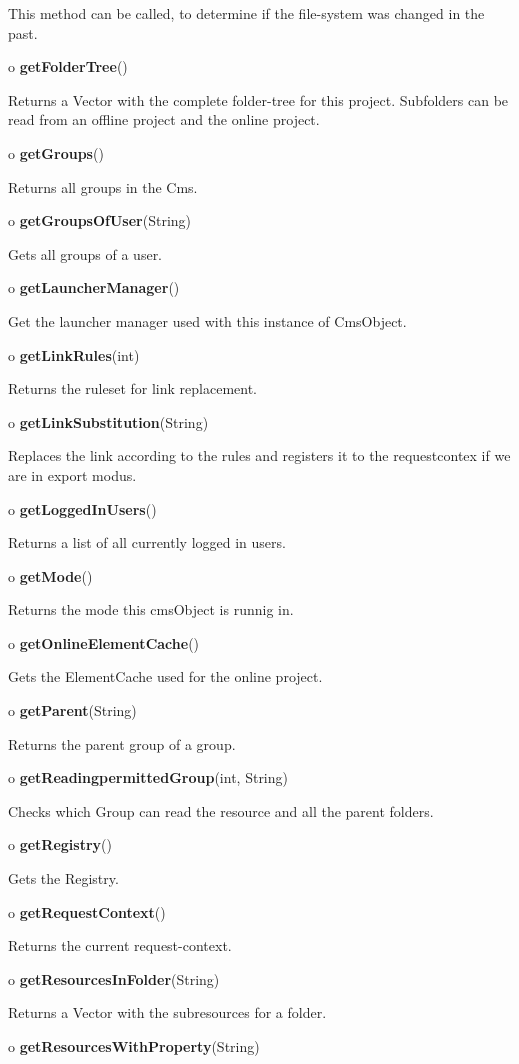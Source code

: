 \begin{description}
This method can be called, to determine if the file-system was changed in the
past.  
\item o {\bf getFolderTree}()  

Returns a Vector with the complete folder-tree for this project.\htmlBR
Subfolders can be read from an offline project and the online project.  
\item o {\bf getGroups}()  

Returns all groups in the Cms.  
\item o {\bf getGroupsOfUser}(String)  

Gets all groups of a user.  
\item o {\bf getLauncherManager}()  

Get the launcher manager used with this instance of CmsObject.  
\item o {\bf getLinkRules}(int)  

Returns the ruleset for link replacement.  
\item o {\bf getLinkSubstitution}(String)  

Replaces the link according to the rules and registers it to the requestcontex
if we are in export modus.  
\item o {\bf getLoggedInUsers}()  

Returns a list of all currently logged in users.  
\item o {\bf getMode}()  

Returns the mode this cmsObject is runnig in.  
\item o {\bf getOnlineElementCache}()  

Gets the ElementCache used for the online project.  
\item o {\bf getParent}(String)  

Returns the parent group of a group.  
\item o {\bf getReadingpermittedGroup}(int, String)  

Checks which Group can read the resource and all the parent folders.  
\item o {\bf getRegistry}()  

Gets the Registry.  
\item o {\bf getRequestContext}()  

Returns the current request-context.  
\item o {\bf getResourcesInFolder}(String)  

Returns a Vector with the subresources for a folder.\htmlBR
\item o {\bf getResourcesWithProperty}(String)  


\end{description}
